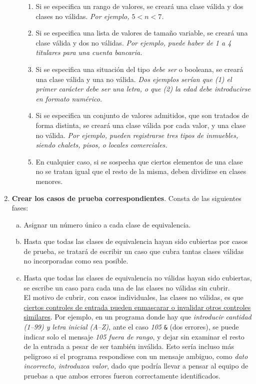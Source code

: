 \begin{enumerate}
\begin{enumerate}[a.]
        \begin{enumerate}[R1.]
            \item Si se especifica un rango de valores, se creará una clase válida y dos clases no válidas. \textit{Por ejemplo, $5<n<7$.}
            \item Si se especifica una lista de valores de tamaño variable, se creará una clase válida y dos no válidas. \textit{Por ejemplo, puede haber de 1 a 4 titulares para una cuenta bancaria.}
            \item Si se especifica una situación del tipo \textit{debe ser} o booleana, se creará una clase válida y una no válida. \textit{Dos ejemplos serían que (1) el primer carácter debe ser una letra, o que (2) la edad debe introducirse en formato numérico.}
            \item Si se especifica un conjunto de valores admitidos, que son tratados de forma distinta, se creará una clase válida por cada valor, y una clase no válida. \textit{Por ejemplo, pueden registrarse tres tipos de inmuebles, siendo chalets, pisos, o locales comerciales.}
            \item En cualquier caso, si se sospecha que ciertos elementos de una clase no se tratan igual que el resto de la misma, deben dividirse en clases menores.
        \end{enumerate}
    \end{enumerate}

    \item \textbf{Crear los casos de prueba correspondientes}. Consta de las siguientes fases:
    
    \begin{enumerate}[a.]
        \item Asignar un número único a cada clase de equivalencia.
        \item Hasta que todas las clases de equivalencia hayan sido cubiertas por casos de prueba, se tratará de escribir un caso que cubra tantas clases válidas no incorporadas como sea posible.
        \item Hasta que todas las clases de equivalencia no válidas hayan sido cubiertas, se escribe un caso para cada una de las clases no válidas sin cubrir.\\
        
        El motivo de cubrir, con casos individuales, las clases no válidas, es que \uline{ciertos controles de entrada pueden enmascarar o invalidar otros controles similares}. Por ejemplo, en un programa donde hay que \textit{introducir cantidad (1--99) y letra inicial (A--Z)}, ante el caso \textit{105} \texttt{\&} (dos errores), se puede indicar solo el mensaje \textit{105 fuera de rango}, y dejar sin examinar el resto de la entrada a pesar de ser también inválida. Esto sería incluso más peligroso si el programa respondiese con un mensaje ambiguo, como \textit{dato incorrecto, introduzca valor}, dado que podría llevar a pensar al equipo de pruebas a que ambos errores fueron correctamente identificados.
    \end{enumerate}
\end{enumerate}

